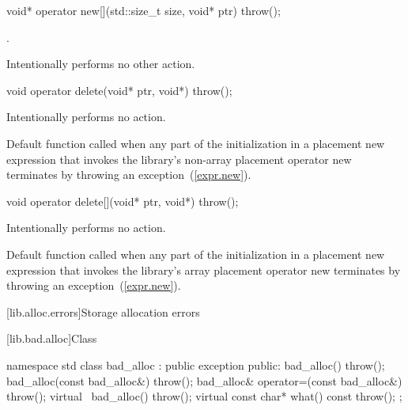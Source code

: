 %
\begin{itemdecl}
void* operator new[](std::size_t size, void* ptr) throw();
\end{itemdecl}

\begin{itemdescr}
\pnum
\returns
{}.

\pnum
\notes
Intentionally performs no other action.
\end{itemdescr}

%
\begin{itemdecl}
void operator delete(void* ptr, void*) throw();
\end{itemdecl}

\begin{itemdescr}
\pnum
\effects
Intentionally performs no action.

\pnum
\notes
Default function called when any part of the initialization in a
placement new expression that invokes the library's
non-array placement operator new
terminates by throwing an exception~(\ref{expr.new}).
\end{itemdescr}

%
\begin{itemdecl}
void operator delete[](void* ptr, void*) throw();
\end{itemdecl}

\begin{itemdescr}
\pnum
\effects
Intentionally performs no action.

\pnum
\notes
Default function called when any part of the initialization in a
placement new expression that invokes the library's
array placement operator new
terminates by throwing an exception~(\ref{expr.new}).
\end{itemdescr}

[lib.alloc.errors]{Storage allocation errors}

%
[lib.bad.alloc]{Class }

\begin{codeblock}
namespace std {
  class bad_alloc : public exception {
  public:
    bad_alloc() throw();
    bad_alloc(const bad_alloc&) throw();
    bad_alloc& operator=(const bad_alloc&) throw();
    virtual ~bad_alloc() throw();
    virtual const char* what() const throw();
  };
}
\end{codeblock}

